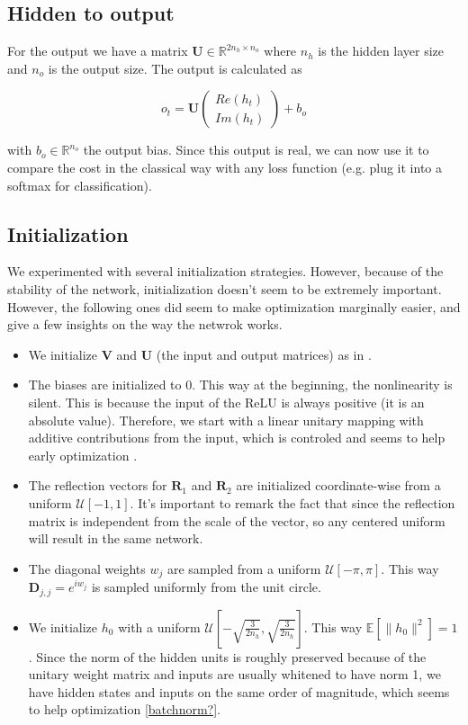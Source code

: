 \documentclass{article} %
\newcommand{\matr}[1]{\mathbf{#1}}
\newcommand\RR{\mathbb{R}}
\begin{document}
\subsection{Hidden to output}

For the output we have a matrix $\matr{U} \in \RR^{2n_h \times n_o}$ where $n_h$ is the hidden layer size and $n_o$ is the output size. The output is calculated as

$$ o_t = \matr{U} \begin{pmatrix} Re(h_t) \\ Im(h_t) \end{pmatrix} + b_o $$

with $b_o \in \RR^{n_o}$ the output bias. Since this output is real, we can now use it to compare the cost in the classical way with any loss function (e.g. plug it into a softmax for classification).
\subsection{Initialization}

We experimented with several initialization strategies. However, because of the stability of the network, initialization doesn't seem to be extremely important. However, the following ones did seem to make optimization marginally easier, and give a few insights on the way the netwrok works.

\begin{itemize}
  \item We initialize $\matr{V}$ and $\matr{U}$ (the input and output matrices) as in \cite{Glorotinit}.
  \item The biases are initialized to 0. This way at the beginning, the nonlinearity is silent. This is because the input of the ReLU is always positive (it is an absolute value). Therefore, we start with a linear unitary mapping with additive contributions from the input, which is controled and seems to help early optimization \citep{Quoc2015}.
  \item The reflection vectors for $\matr{R}_1$ and $\matr{R}_2$ are initialized coordinate-wise from a uniform $\mathcal{U}[-1, 1]$. It's important to remark the fact that since the reflection matrix is independent from the scale of the vector, so any centered uniform will result in the same network.
  \item The diagonal weights $w_j$ are sampled from a uniform $\mathcal{U}[-\pi, \pi]$. This way $\matr{D}_{j,j} = e^{i w_j}$ is sampled uniformly from the unit circle.
  \item We initialize $h_0$ with a uniform $\mathcal{U}[-\sqrt{\frac{3}{2n_h}}, \sqrt{\frac{3}{2n_h}}]$. This way $\mathbb{E}\left[\|h_0\|^2\right] = 1$. Since the norm of the hidden units is roughly preserved because of the unitary weight matrix and inputs are usually whitened to have norm 1, we have hidden states and inputs on the same order of magnitude, which seems to help optimization \ref{batchnorm?}.
\end{itemize}



\end{document}
